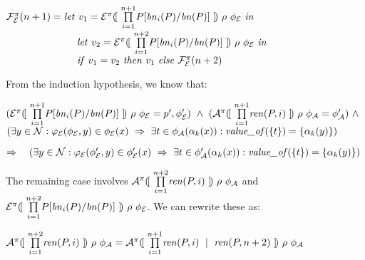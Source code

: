 \documentclass[10pt,a4paper,final,oneside,fleqn]{book}
\begin{document}
\noindent
$\mathcal{F}_\mathcal{E}^\pi(n+1)=\mbox{{\itshape let\/} }v_1=\mathcal{E}^\pi(\![~\underset{i=1}{\overset{n+1}{\prod}}P[\mbox{{\itshape bn\/}}_i(P)/\mbox{{\itshape bn\/}}(P)]~]\!)~\rho~\phi_\mathcal{E}\mbox{ {\itshape in\/}}$\\
$\hspace{25mm}\mbox{{\itshape let\/} }v_2=\mathcal{E}^\pi(\![~\underset{i=1}{\overset{n+2}{\prod}}P[\mbox{{\itshape bn\/}}_i(P)/\mbox{{\itshape bn\/}}(P)]~]\!)~\rho~\phi_\mathcal{E}\mbox{ {\itshape in\/}}$\\
$\hspace{25mm}\mbox{{\itshape if\/} }v_1=v_2\mbox{ {\itshape then\/} }v_1\mbox{ {\itshape else\/} }\mathcal{F}_\mathcal{E}^\pi(n+2)$\vspace{5mm}

\noindent
From the induction hypothesis, we know that:

\noindent
$(\mathcal{E}^\pi(\![~\underset{i=1}{\overset{n+1}{\prod}}P[\mbox{{\itshape bn\/}}_i(P)/\mbox{{\itshape bn\/}}(P)]~]\!)~\rho~\phi_\mathcal{E}=p',\phi'_\mathcal{E})~\wedge~(\mathcal{A}^\pi(\![~\underset{i=1}{\overset{n+1}{\prod}}\mbox{{\itshape ren\/}}(P,i)~]\!)~\rho~\phi_\mathcal{A}=\phi'_\mathcal{A})~\wedge$\\
$(\exists y\in\mathcal{N}:\varphi_\mathcal{E}(\phi_\mathcal{E},y)\in\phi_\mathcal{E}(x)~\Rightarrow~\exists t\in\phi_\mathcal{A}(\alpha_k(x)):\mbox{{\itshape value\_of\/}}(\{t\})=\{\alpha_k(y)\})$\vspace{5mm}

\noindent
$\Rightarrow~~~(\exists y\in\mathcal{N}:\varphi_\mathcal{E}(\phi'_\mathcal{E},y)\in\phi'_\mathcal{E}(x)~\Rightarrow~\exists t\in\phi'_\mathcal{A}(\alpha_k(x)):\mbox{{\itshape value\_of\/}}(\{t\})=\{\alpha_k(y)\})$\vspace{5mm}

\noindent
The remaining case involves
$\mathcal{A}^\pi(\![~\underset{i=1}{\overset{n+2}{\prod}}\mbox{{\itshape ren\/}}(P,i)~]\!)~\rho~\phi_\mathcal{A}$ and $\mathcal{E}^\pi(\![~\underset{i=1}{\overset{n+2}{\prod}}P[\mbox{{\itshape bn\/}}_i(P)/\mbox{{\itshape bn\/}}(P)]~]\!)~\rho~\phi_\mathcal{E}$.  We can rewrite these as:

\noindent
$\mathcal{A}^\pi(\![~\underset{i=1}{\overset{n+2}{\prod}}\mbox{{\itshape ren\/}}(P,i)~]\!)~\rho~\phi_\mathcal{A}=\mathcal{A}^\pi(\![~\underset{i=1}{\overset{n+1}{\prod}}\mbox{{\itshape ren\/}}(P,i)~\mid~\mbox{{\itshape ren\/}}(P,n+2)~]\!)~\rho~\phi_\mathcal{A}$\vspace{5mm}
\end{document}
